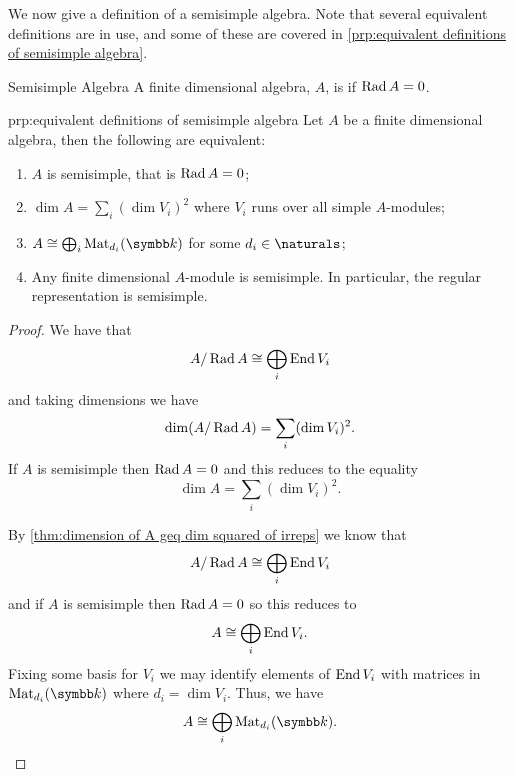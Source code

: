 We now give a definition of a semisimple algebra.
Note that several equivalent definitions are in use, and some of these are covered in \cref{prp:equivalent definitions of semisimple algebra}.

\begin{dfn}{Semisimple Algebra}{}
    A finite dimensional algebra, \(A\), is  if \(\operatorname{Rad} A = 0\).
\end{dfn}

\begin{prp}{}{prp:equivalent definitions of semisimple algebra}
    Let \(A\) be a finite dimensional algebra, then the following are equivalent:
    \begin{enumerate}[label=(\textsc{\roman*})]
        \item \(A\) is semisimple, that is \(\operatorname{Rad} A = 0\);
        \item \(\dim A = \sum_i (\dim V_i)^2\) where \(V_i\) runs over all simple \(A\)-modules;
        \item \(A \isomorphic \bigoplus_i \matrices{d_i}{\field}\) for some \(d_i \in \naturals\);
        \item Any finite dimensional \(A\)-module is semisimple.
        In particular, the regular representation is semisimple.
    \end{enumerate}
    \begin{proof}
        We have that
        \begin{equation}
            A/\operatorname{Rad} A \cong \bigoplus_i \operatorname{End} V_i
        \end{equation}
        and taking dimensions we have
        \begin{equation}
            \dim(A/\operatorname{Rad} A) = \sum_i (\dim V_i)^2.
        \end{equation}
        If \(A\) is semisimple then \(\operatorname{Rad} A = 0\) and this reduces to the equality
        \begin{equation}
            \dim A = \sum_i (\dim V_i)^2.
        \end{equation}
        
        By \cref{thm:dimension of A geq dim squared of irreps} we know that
        \begin{equation}
            A/\operatorname{Rad} A \cong \bigoplus_i \operatorname{End} V_i
        \end{equation}
        and if \(A\) is semisimple then \(\operatorname{Rad} A = 0\) so this reduces to
        \begin{equation}
            A \cong \bigoplus_i \operatorname{End} V_i.
        \end{equation}
        Fixing some basis for \(V_i\) we may identify elements of \(\operatorname{End} V_i\) with matrices in \(\matrices{d_i}{\field}\) where \(d_i = \dim V_i\).
        Thus, we have
        \begin{equation}
            A \isomorphic \bigoplus_i \matrices{d_i}{\field}.
        \end{equation}
        

\end{proof}
\end{prp}
